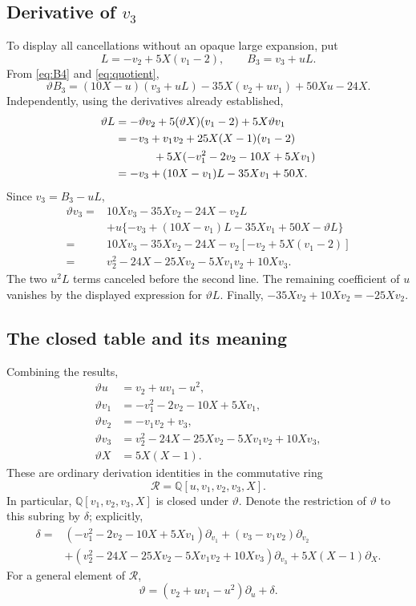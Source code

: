 \documentclass[11pt,a4paper]{article}
\numberwithin{equation}{section}
\newcommand{\QQ}{\mathbb Q}
\newcommand{\tht}{\vartheta}
\newcommand{\del}{\partial}
\begin{document}
\subsection{Derivative of \texorpdfstring{$v_3$}{v3}}
To display all cancellations without an opaque large expansion, put
\begin{equation}
L=-v_2+5X(v_1-2),\qquad B_3=v_3+uL.
\end{equation}
From \eqref{eq:B4} and \eqref{eq:quotient},
\begin{equation}
\tht B_3=(10X-u)(v_3+uL)-35X(v_2+uv_1)+50Xu-24X.
\end{equation}
Independently, using the derivatives already established,
\begin{align}
\tht L
 &=-\tht v_2+5(\tht X)(v_1-2)+5X\tht v_1\\
 &=-v_3+v_1v_2+25X(X-1)(v_1-2)\\
 &\hspace{12mm}+5X(-v_1^2-2v_2-10X+5Xv_1)\\
 &=-v_3+(10X-v_1)L-35Xv_1+50X.
\end{align}
Since $v_3=B_3-uL$,
\begin{align}
\tht v_3={}&10Xv_3-35Xv_2-24X-v_2L\\
 &+u\{-v_3+(10X-v_1)L-35Xv_1+50X-\tht L\}\\
={}&10Xv_3-35Xv_2-24X-v_2[-v_2+5X(v_1-2)]\\
={}&v_2^2-24X-25Xv_2-5Xv_1v_2+10Xv_3.
\end{align}
The two $u^2L$ terms canceled before the second line. The remaining
coefficient of $u$ vanishes by the displayed expression for $\tht L$.
Finally, $-35Xv_2+10Xv_2=-25Xv_2$.

\subsection{The closed table and its meaning}
Combining the results,
\begin{equation}\boxed{\begin{aligned}
\tht u&=v_2+uv_1-u^2,\\
\tht v_1&=-v_1^2-2v_2-10X+5Xv_1,\\
\tht v_2&=-v_1v_2+v_3,\\
\tht v_3&=v_2^2-24X-25Xv_2-5Xv_1v_2+10Xv_3,\\
\tht X&=5X(X-1).
\end{aligned}}\label{eq:table}
\end{equation}
These are ordinary derivation identities in the commutative ring
\begin{equation}
\mathcal R=\QQ[u,v_1,v_2,v_3,X].
\end{equation}
In particular, $\QQ[v_1,v_2,v_3,X]$ is closed under $\tht$. Denote the
restriction of $\tht$ to this subring by $\delta$; explicitly,
\begin{align}
\delta={}&(-v_1^2-2v_2-10X+5Xv_1)\del_{v_1}
 +(v_3-v_1v_2)\del_{v_2}\\
 &+(v_2^2-24X-25Xv_2-5Xv_1v_2+10Xv_3)\del_{v_3}
 +5X(X-1)\del_X.
\end{align}
For a general element of $\mathcal R$,
\begin{equation}
\tht=(v_2+uv_1-u^2)\del_u+\delta.
\end{equation}
\end{document}
